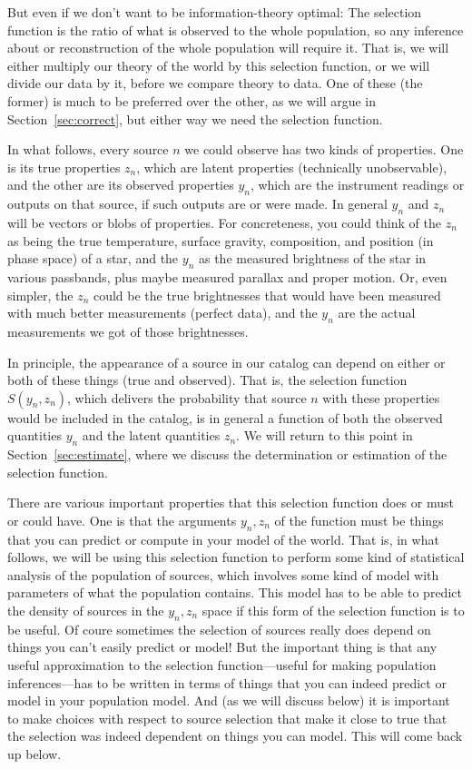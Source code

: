 \documentclass[modern]{aastex62}
\newcommand{\sectionname}{Section}
\begin{document}
But even if we don't want to be information-theory optimal: The
selection function is the ratio of what is observed to the whole
population, so any inference about or reconstruction of the whole
population will require it.
That is, we will either multiply our theory of the world by this
selection function, or we will divide our data by it, before we
compare theory to data.
One of these (the former) is much to be preferred over the other, as
we will argue in \sectionname~\ref{sec:correct}, but either way we
need the selection function.

In what follows, every source $n$ we could observe has two kinds of
properties.
One is its true properties $z_n$, which are latent
properties (technically unobservable), and the other are its observed
properties $y_n$, which are the instrument readings or outputs on that
source, if such outputs are or were made.
In general $y_n$ and $z_n$ will be vectors or blobs of properties.
For concreteness, you could think of the $z_n$ as being the true
temperature, surface gravity, composition, and position (in phase
space) of a star, and the $y_n$ as the measured brightness of the star
in various passbands, plus maybe measured parallax and proper motion.
Or, even simpler, the $z_n$ could be the true brightnesses that would
have been measured with much better measurements (perfect data), and
the $y_n$ are the actual measurements we got of those brightnesses.

In principle, the appearance of a source in our catalog can depend
on either or both of these things (true and observed).
That is, the selection function $S(y_n, z_n)$, which delivers the
probability that source $n$ with these properties would be included in
the catalog, is in general a function of both the observed quantities
$y_n$ and the latent quantities $z_n$.
We will return to this point in \sectionname~\ref{sec:estimate},
where we discuss the determination or estimation of the selection
function.

There are various important properties that this selection function
does or must or could have.
One is that the arguments $y_n, z_n$ of the function must be things
that you can predict or compute in your model of the world.
That is, in what follows, we will be using this selection function to
perform some kind of statistical analysis of the population of
sources, which involves some kind of model with parameters of what the
population contains.
This model has to be able to predict the density of sources in the
$y_n, z_n$ space if this form of the selection function is to be
useful.
Of coure sometimes the selection of sources really does depend on
things you can't easily predict or model!
But the important thing is that any useful approximation to the
selection function---useful for making population inferences---has to
be written in terms of things that you can indeed predict or model in
your population model.
And (as we will discuss below) it is important to make choices with
respect to source selection that make it close to true that the
selection was indeed dependent on things you can model.
This will come back up below.
\end{document}
